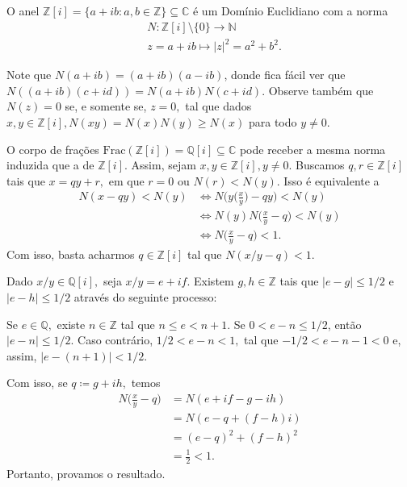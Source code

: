 \documentclass[AlgebraII/algebraII_notes.tex]{subfiles}
\begin{document}
\begin{theorem*}
	O anel \(\mathbb{Z}[i] = \{a + ib: a, b\in \mathbb{Z}\}\subseteq{\mathbb{C}}\) é um Domínio Euclidiano com a norma
	\begin{align*}
		 & N:\mathbb{Z}[i]\setminus{\{0\}}\rightarrow \mathbb{N} \\
		 & z = a + ib\mapsto |z|^{2} = a^{2} + b^{2}.
	\end{align*}
\end{theorem*}
\begin{proof*}
	Note que \(N(a+ib) = (a+ib)(a-ib)\), donde fica fácil ver que \(N((a+ib)(c+id)) = N(a+ib)N(c+id)\).
	Observe também que \(N(z) = 0\) se, e somente se, \(z = 0,\) tal que dados \(x, y\in \mathbb{Z}[i], N(xy) = N(x)N(y)
	\geq N(x)\) para todo \(y\neq0\).

	O corpo de frações \(\mathrm{Frac}(\mathbb{Z}[i]) = \mathbb{Q}[i] \subseteq{\mathbb{C}}\) pode receber a mesma norma
	induzida que a de \(\mathbb{Z}[i]\). Assim, sejam \(x, y\in \mathbb{Z}[i], y\neq0.\) Buscamos \(q, r\in \mathbb{Z}[i]\) tais que
	\(x = qy + r,\) em que \(r=0\) ou \(N(r) < N(y)\). Isso é equivalente a
	\begin{align*}
		N(x-qy) < N(y) & \Longleftrightarrow N \biggl(y \biggl(\frac{x}{y}\biggr) - qy\biggr) < N(y) \\
		               & \Longleftrightarrow N(y) N \biggl(\frac{x}{y}-q\biggr) < N(y)               \\
		               & \Longleftrightarrow N \biggl(\frac{x}{y} - q\biggr) < 1.
	\end{align*}
	Com isso, basta acharmos \(q\in \mathbb{Z}[i]\) tal que \(N(x/y - q) < 1.\)

	Dado \(x/y\in \mathbb{Q}[i],\) seja \(x/y = e + if.\) Existem \(g, h\in \mathbb{Z}\)
	tais que \(|e-g|\leq 1/2\) e \(|e-h|\leq 1/2\) através do seguinte processo:

	Se \(e\in \mathbb{Q},\) existe \(n\in \mathbb{Z}\) tal que \(n\leq e < n+1.\) Se \(0 < e-n\leq 1/2\),
	então \(|e-n|\leq 1/2\). Caso contrário, \(1/2 < e-n < 1,\) tal que \(-1/2 < e - n - 1 < 0\) e, assim,
	\(|e-(n+1)| < 1/2\).

	Com isso, se \(q\coloneqq g + ih,\) temos
	\begin{align*}
		N \biggl(\frac{x}{y} - q\biggr) & = N(e + if - g - ih)    \\
		                                & = N(e - q + (f-h)i)     \\
		                                & = (e-q)^{2} + (f-h)^{2} \\
		                                & =\frac{1}{2} < 1.
	\end{align*}
	Portanto, provamos o resultado. \qedsymbol
\end{proof*}
\end{document}

